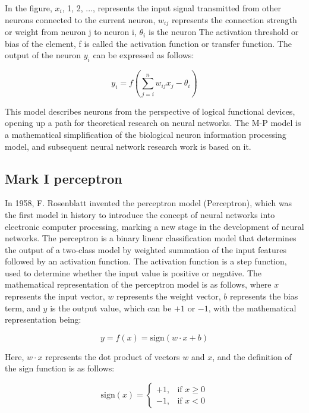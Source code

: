 \documentclass[paper=a4, fontsize=11pt]{scrartcl} %
\numberwithin{equation}{section} %
\numberwithin{figure}{section} %
\numberwithin{table}{section} %
\begin{document}
In the figure, $x_i$, 1, 2, ..., represents the input signal transmitted from other neurons connected to the current neuron, $w_{ij}$ represents the connection strength or weight from neuron j to neuron i, $\theta_i$ is the neuron The activation threshold or bias of the element, f is called the activation function or transfer function. The output of the neuron $y_i$ can be expressed as follows:

\begin{equation}
    y_i = f(\sum_{j=i}^{n} w_{ij}x_j-\theta_i)
\end{equation}


This model describes neurons from the perspective of logical functional devices, opening up a path for theoretical research on neural networks. The M-P model is a mathematical simplification of the biological neuron information processing model, and subsequent neural network research work is based on it. 

\subsection{Mark I perceptron}


In 1958, F. Rosenblatt invented the perceptron model (Perceptron), which was the first model in history to introduce the concept of neural networks into electronic computer processing, marking a new stage in the development of neural networks. The perceptron is a binary linear classification model that determines the output of a two-class model by weighted summation of the input features followed by an activation function. The activation function is a step function, used to determine whether the input value is positive or negative. The mathematical representation of the perceptron model is as follows, where \( x \) represents the input vector, \( w \) represents the weight vector, \( b \) represents the bias term, and \( y \) is the output value, which can be \(+1\) or \(-1\), with the mathematical representation being:


\begin{equation}
    y = f(x) = \text{sign}(w \cdot x + b)
\end{equation}

Here, \( w \cdot x \) represents the dot product of vectors \( w \) and \( x \), and the definition of the \( \text{sign} \) function is as follows:

\begin{equation}
    \text{sign}(x) = 
\begin{cases}
+1, & \text{if } x \geq 0 \\
-1, & \text{if } x < 0
\end{cases}
\end{equation}
\end{document}
